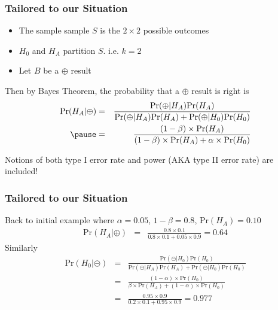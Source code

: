 \documentclass[slides]{beamer}
\newcommand{\blue}[1]{\textcolor{blue2}{#1}}
\newcommand{\prob}{\mbox{Pr}}
\newcommand{\cp}{\oplus}
\newcommand{\cm}{\circleddash}
\begin{document}
\begin{frame}[fragile]
\frametitle{Tailored to our Situation}

\begin{itemize}
\item The sample sample $S$ is the $2\times 2$ possible outcomes
\item $H_0$ and $H_A$ partition $S$.  i.e. $k=2$
\item Let $B$ be a $\cp$ result
\end{itemize}
\pause
Then by Bayes Theorem, the probability that a $\cp$ result is right is
\begin{eqnarray*}
\prob(H_A|\cp) &=& \frac{\prob(\cp|H_A)\prob(H_A)}{\prob(\cp|H_A)\prob(H_A) + \prob(\cp|H_0)\prob(H_0)} \\
\pause &=& \frac{(1-\beta)\times\prob(H_A)}{(1-\beta)\times\prob(H_A) + \alpha\times\prob(H_0)}\end{eqnarray*}

Notions of \blue{both} type I error rate and power (AKA type II error rate) are included!

\end{frame}


\begin{frame}[fragile]
\frametitle{Tailored to our Situation}
Back to initial example where $\alpha=0.05$, $1-\beta=0.8$, $\prob(H_A)=0.10$
\pause
\begin{eqnarray*}
\prob(H_A|\cp) &=& \frac{0.8 \times 0.1}{0.8 \times 0.1 + 0.05\times 0.9} = 0.64
\end{eqnarray*}
\pause
Similarly
\begin{eqnarray*}
\prob(H_0|\cm) &=& \frac{\prob(\cm|H_0)\prob(H_0)}{\prob(\cm|H_A)\prob(H_A) + \prob(\cm|H_0)\prob(H_0)} \\
&=& \frac{(1-\alpha)\times\prob(H_0)}{
\beta\times\prob(H_A) + (1-\alpha)\times\prob(H_0)}\\
&=& \frac{0.95 \times 0.9}{0.2\times 0.1 + 0.95 \times 0.9} = 0.977\\
\end{eqnarray*}


\end{frame}
\end{document}
